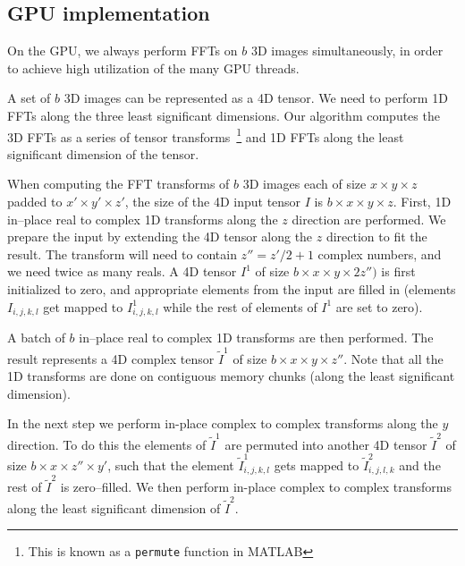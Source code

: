 \documentclass[conference]{./IEEEtran/IEEEtran}
\begin{document}

\subsection{GPU implementation}

\label{sec:gpu-fft-impl}

  On the GPU, we always perform FFTs on $b$ 3D images
  simultaneously, in order to achieve high utilization of the many
  GPU threads.

  A set of $b$ 3D images can be represented as a 4D tensor.  We need
  to perform 1D FFTs along the three least significant dimensions.
  Our algorithm computes the 3D FFTs as a series of tensor
  transforms~\footnote{This is known as a \texttt{permute} function in
    MATLAB} and 1D FFTs along the least significant dimension of the
  tensor.

  When computing the FFT transforms of $b$ 3D images each of size $x
  \times y \times z$ padded to $x' \times y' \times z'$, the size of
  the 4D input tensor $I$ is $b \times x \times y \times z$.  First,
  1D in--place real to complex 1D transforms along the $z$ direction
  are performed. We prepare the input by extending the 4D tensor along
  the $z$ direction to fit the result.  The transform will need to
  contain $z'' = z' / 2 + 1$ complex numbers, and we need twice as
  many reals.  A 4D tensor $I^1$ of size $b \times x \times y \times
  2z'')$ is first initialized to zero, and appropriate elements from
  the input are filled in (elements $I_{i,j,k,l}$ get mapped to
  $I^1_{i,j,k,l}$ while the rest of elements of $I^1$ are set to
  zero).

  A batch of $b$ in--place real to complex 1D transforms are then
  performed.  The result represents a 4D complex tensor
  $\widetilde{I}^1$ of size $b \times x \times y \times z''$.  Note
  that all the 1D transforms are done on contiguous memory chunks
  (along the least significant dimension).

  In the next step we perform in-place complex to complex transforms
  along the $y$ direction.  To do this the elements of
  $\widetilde{I}^1$ are permuted into another 4D tensor
  $\widetilde{I}^2$ of size $b \times x \times z'' \times y'$, such
  that the element $\widetilde{I}^1_{i,j,k,l}$ gets mapped to
  $\widetilde{I}^2_{i,j,l,k}$ and the rest of $\widetilde{I}^2$ is
  zero--filled.  We then perform in-place complex to complex
  transforms along the least significant dimension of
  $\widetilde{I}^2$.
\end{document}

